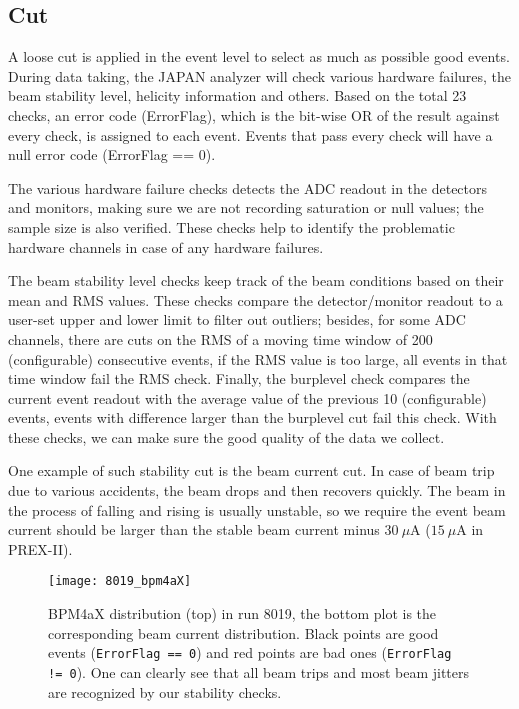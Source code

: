 \subsection{Cut}
A loose cut is applied in the event level to select as much as possible good events.
During data taking, the JAPAN analyzer will check various hardware failures, the
beam stability level, helicity information and others. Based on the total 23 checks,
an error code (ErrorFlag), which is the bit-wise OR of the result against every
check, is assigned to each event. Events that pass every check will have
a null error code (ErrorFlag == 0). 

The various hardware failure checks detects the ADC readout in the detectors and
monitors, making sure we are not recording saturation or null values; the 
sample size is also verified. These checks help to identify the problematic
hardware channels in case of any hardware failures.

The beam stability level checks keep track of the beam conditions based on their
mean and RMS values. These checks compare the detector/monitor readout to 
a user-set upper and lower limit to filter out outliers; besides, for some ADC 
channels, there are cuts on the RMS of a moving time window of 200 (configurable) %
consecutive events, if the RMS value is too large, 
all events in that time window fail the RMS check. 
Finally, the burplevel check compares the current event readout with the average
value of the previous 10 (configurable) events, events with difference larger than
the burplevel cut fail this check. With these checks, we can make sure the good 
quality of the data we collect.

One example of such stability cut is the beam current cut. In case of beam trip
due to various accidents, the beam drops and then recovers quickly. The beam in
the process of falling and rising is usually unstable, so we require the event
beam current should be larger than the stable beam current minus $30\ \mu$A ($15\ \mu$A in PREX-II).

\begin{figure}[!h]
    \centering
    \texttt{[image: 8019\_bpm4aX]}
    \caption[BPM4aX distributionn in run 8019]
    {BPM4aX distribution (top) in run 8019, the bottom plot is the corresponding
    beam current distribution. Black points are good events (\texttt{ErrorFlag == 0}) 
    and red points are bad ones (\texttt{ErrorFlag != 0}). 
    One can clearly see that all beam trips and most beam jitters are recognized 
    by our stability checks.}
\end{figure}

